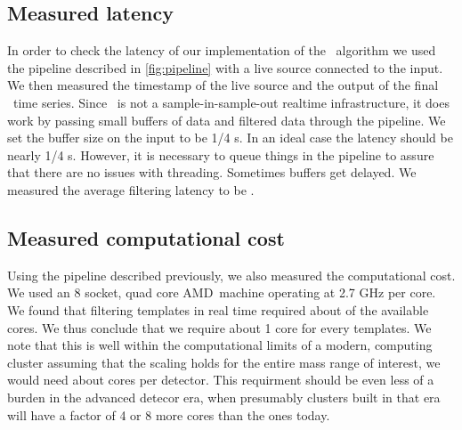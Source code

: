 \subsection{Measured latency}

In order to check the latency of our implementation of the \lloid\ algorithm we
used the pipeline described in \ref{fig:pipeline} with a live source connected
to the input.  We then measured the timestamp of the live source and the output
of the final \SNR\ time series.  Since \gstreamer\ is not a
sample-in-sample-out realtime infrastructure, it does work by passing small
buffers of data and filtered data through the pipeline.  We set the buffer size
on the input to be 1/4 s.  In an ideal case the latency should be nearly 1/4 s.
However, it is necessary to queue things in the pipeline to assure that there
are no issues with threading. Sometimes buffers get delayed.  We measured the
average filtering latency to be .

\subsection{Measured computational cost}

Using the pipeline described previously, we also measured the computational
cost.  We used an 8 socket, quad core AMD\texttrademark\ machine operating at
2.7 GHz per core.  We found that filtering  templates in real time
required about  of the available cores.  We thus conclude that we
require about 1 core for every  templates.  We note that this is
well within the computational limits of a modern, computing cluster assuming
that the scaling holds for the entire mass range of interest, we would need
about  cores per detector.  This requirment should be even less of a
burden in the advanced detecor era, when presumably clusters built in that era
will have a factor of 4 or 8 more cores than the ones today. 

